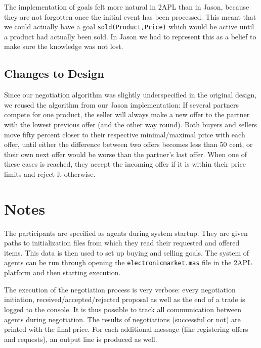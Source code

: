 \documentclass[a4paper,11pt]{article}
\begin{document}
The implementation of goals felt more natural in 2APL than in Jason, because they are not forgotten once the initial event has been processed. This meant that we could actually have a goal \texttt{sold(Product,Price)} which would be active until a product had actually been sold. In Jason we had to represent this as a belief to make sure the knowledge was not lost.

\subsection{Changes to Design}
Since our negotiation algorithm was slightly underspecified in the original design, we reused the algorithm from our Jason implementation: If several partners compete for one product, the seller will always make a new offer to the partner with the lowest previous offer (and the other way round). Both buyers and sellers move fifty percent closer to their respective minimal/maximal price with each offer, until either the difference between two offers becomes less than 50 cent, or their own next offer would be worse than the partner's last offer. When one of these cases is reached, they accept the incoming offer if it is within their price limits and reject it otherwise.

\section{Notes}
The participants are specified as agents during system startup. They are given paths to initialization files from which they read their requested and offered items. This data is then used to set up buying and selling goals. The system of agents can be run through opening the \texttt{electronicmarket.mas} file in the 2APL platform and then starting execution.

The execution of the negotiation process is very verbose: every negotiation initiation, received/accepted/rejected proposal as well as the end of a trade is logged to the console. It is thus possible to track all communication between agents during negotiation. The results of negotiations (successful or not) are printed with the final price. For each additional message (like registering offers and requests), an output line is produced as well.
\end{document}
